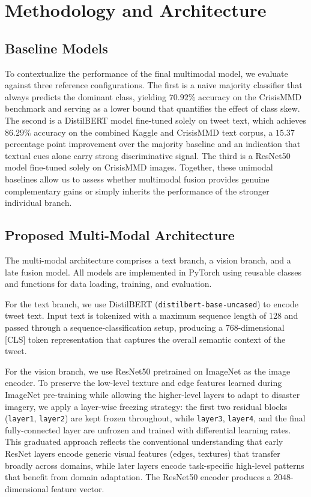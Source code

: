 \documentclass[11pt,letterpaper]{article}
\begin{document}
\section{Methodology and Architecture}

\subsection{Baseline Models}
To contextualize the performance of the final multimodal model, we evaluate against three reference configurations. The first is a naive majority classifier that always predicts the dominant class, yielding $70.92\%$ accuracy on the CrisisMMD benchmark and serving as a lower bound that quantifies the effect of class skew. The second is a DistilBERT model fine-tuned solely on tweet text, which achieves $86.29\%$ accuracy on the combined Kaggle and CrisisMMD text corpus, a $15.37$ percentage point improvement over the majority baseline and an indication that textual cues alone carry strong discriminative signal. The third is a ResNet50 model fine-tuned solely on CrisisMMD images. Together, these unimodal baselines allow us to assess whether multimodal fusion provides genuine complementary gains or simply inherits the performance of the stronger individual branch.

\subsection{Proposed Multi-Modal Architecture}
The multi-modal architecture comprises a text branch, a vision branch, and a late fusion model. All models are implemented in PyTorch using reusable classes and functions for data loading, training, and evaluation.

For the text branch, we use DistilBERT (\texttt{distilbert-base-uncased}) to encode tweet text. Input text is tokenized with a maximum sequence length of $128$ and passed through a sequence-classification setup, producing a $768$-dimensional [CLS] token representation that captures the overall semantic context of the tweet.

For the vision branch, we use ResNet50 pretrained on ImageNet \cite{imagenet} as the image encoder. To preserve the low-level texture and edge features learned during ImageNet pre-training while allowing the higher-level layers to adapt to disaster imagery, we apply a layer-wise freezing strategy: the first two residual blocks (\texttt{layer1}, \texttt{layer2}) are kept frozen throughout, while \texttt{layer3}, \texttt{layer4}, and the final fully-connected layer are unfrozen and trained with differential learning rates. This graduated approach reflects the conventional understanding that early ResNet layers encode generic visual features (edges, textures) that transfer broadly across domains, while later layers encode task-specific high-level patterns that benefit from domain adaptation. The ResNet50 encoder produces a $2048$-dimensional feature vector.
\end{document}
